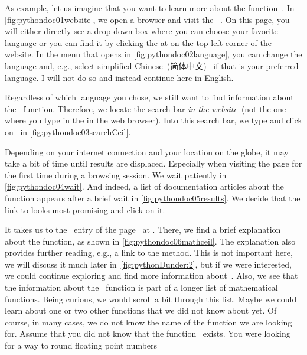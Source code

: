 As example, let us imagine that you want to learn more about the function~.
In \cref{fig:pythondoc01website}, we open a browser and visit the ~\cite{PSF:P3D}.
On this page, you will either directly see a drop-down box where you can choose your favorite language or you can find it by clicking the \menu{\threeBarButton} at on the top-left corner of the website.
In the menu that opens in \cref{fig:pythondoc02language}, you can change the language and, e.g., select simplified Chinese~(简体中文)~\cite{SCR1956ROTSCOPTSCCS1} if that is your preferred language.
I will not do so and instead continue here in English.

Regardless of which language you chose, we still want to find information about the ~function.
Therefore, we locate the search bar \emph{in the website}~(not the one where you type in the  in the web browser).
Into this search bar, we type  and click on~ in \cref{fig:pythondoc03searchCeil}.

Depending on your internet connection and your location on the globe, it may take a bit of time until results are displaced.
Especially when visiting the page for the first time during a browsing session.
We wait patiently in \cref{fig:pythondoc04wait}.
And indeed, a list of documentation articles about the  function appears after a brief wait in \cref{fig:pythondoc05results}.
We decide that the link to  looks most promising and click on it.

It takes us to the ~entry of the  page~\cite{PSF:P3D:TPSL:MMF} at .
There, we find a brief explanation about the  function, as shown in \cref{fig:pythondoc06mathceil}.
The explanation also provides further reading, e.g., a link to the  method.
This is not important here, we will discuss it much later in~\cref{fig:pythonDunder:2}, but if we were interested, we could continue exploring and find more information about~.
Also, we see that the information about the ~function is part of a longer list of mathematical functions.
Being curious, we would scroll a bit through this list.
Maybe we could learn about one or two other functions that we did not know about yet.%
%
%
%
Of course, in many cases, we do not know the name of the function we are looking for.
Assume that you did not know that the function~ exists.
You were looking for a way to round floating point numbers 

